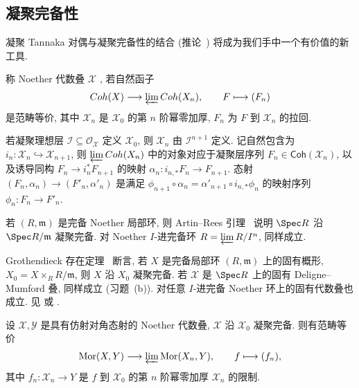 \subsection{凝聚完备性}\label{src:7.6.2-subsection}
凝聚 Tannaka 对偶与凝聚完备性的结合 (推论~) 将成为我们手中一个有价值的新工具.
\begin{definition}\label{src:7.6.5}
称 Noether 代数叠 $\mathcal X$ , 若自然函子
\begin{align*}
\mathsf{Coh}(\mathcal X)\longrightarrow\varprojlim\mathsf{Coh}(\mathcal X_n),\qquad F\longmapsto(F_n)
\end{align*}
是范畴等价, 其中 $\mathcal X_n$ 是 $\mathcal X_0$ 的第 $n$ 阶幂零加厚, $F_n$ 为 $F$ 到 $\mathcal X_n$ 的拉回.
\end{definition}
\begin{remark}\label{src:7.6.6}
若凝聚理想层 $\mathcal I\subseteq\mathcal O_{\mathcal X}$ 定义 $\mathcal X_0$, 则 $\mathcal X_n$ 由 $\mathcal I^{n+1}$ 定义. 记自然包含为 $i_n:\mathcal X_n\hookrightarrow\mathcal X_{n+1}$, 则 $\varprojlim\mathsf{Coh}(\mathcal X_n)$ 中的对象对应于凝聚层序列 $F_n\in\mathsf{Coh}(\mathcal X_n)$, 以及诱导同构 $F_n\to i_n^*F_{n+1}$ 的映射 $\alpha_n:i_{n,*}F_n\to F_{n+1}$. 态射 $(F_n,\alpha_n)\to(F'_n,\alpha'_n)$ 是满足 $\phi_{n+1}\circ\alpha_n=\alpha'_{n+1}\circ i_{n,*}\phi_n$ 的映射序列 $\phi_n:F_n\to F'_n$.
\end{remark}
\begin{example}\label{src:7.6.7}
若 $(R,\mathfrak m)$ 是完备 Noether 局部环, 则 Artin--Rees 引理~ 说明 $\Spec R$ 沿 $\Spec R/\mathfrak m$ 凝聚完备. 对 Noether $I$-进完备环 $R=\varprojlim R/I^n$, 同样成立.
\end{example}
\begin{example}\label{src:7.6.8}
Grothendieck 存在定理~ 断言, 若 $X$ 是完备局部环 $(R,\mathfrak m)$ 上的固有概形, $X_0=X\times_RR/\mathfrak m$, 则 $X$ 沿 $X_0$ 凝聚完备. 若 $\mathcal X$ 是 $\Spec R$ 上的固有 Deligne--Mumford 叠, 同样成立 (习题~(b)). 对任意 $I$-进完备 Noether 环上的固有代数叠也成立. 见 \cite[定理 1.4]{Ols05} 或 \cite[定理 4.1]{Con05a}.
\end{example}
\begin{corollary}[凝聚 Tannaka 对偶]\label{src:7.6.9}
设 $\mathcal X,\mathcal Y$ 是具有仿射对角态射的 Noether 代数叠, $\mathcal X$ 沿 $\mathcal X_0$ 凝聚完备. 则有范畴等价
\begin{align*}
\operatorname{Mor}(\mathcal X,\mathcal Y)\longrightarrow\varprojlim\operatorname{Mor}(\mathcal X_n,\mathcal Y),\qquad f\longmapsto(f_n),
\end{align*}
其中 $f_n:\mathcal X_n\to Y$ 是 $f$ 到 $\mathcal X_0$ 的第 $n$ 阶幂零加厚 $\mathcal X_n$ 的限制.
\end{corollary}
